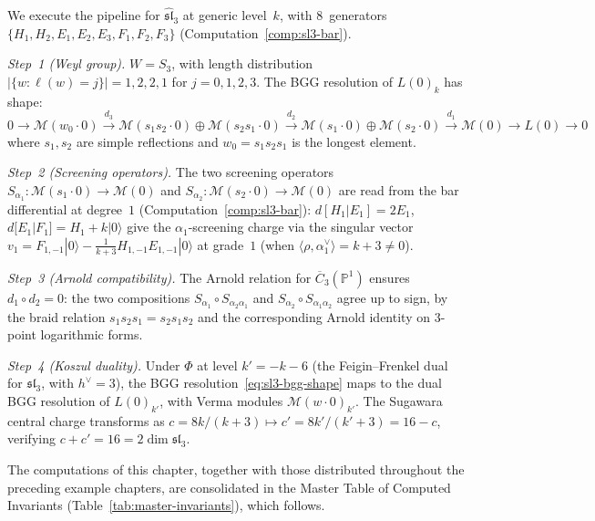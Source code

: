 \begin{example}
\label{ex:sl3-bgg-pipeline}
We execute the pipeline for $\widehat{\mathfrak{sl}}_3$ at generic
level~$k$, with $8$~generators
$\{H_1, H_2, E_1, E_2, E_3, F_1, F_2, F_3\}$
(Computation~\ref{comp:sl3-bar}).

\emph{Step~1 (Weyl group).}
$W = S_3$, with length distribution
$|\{w : \ell(w) = j\}| = 1, 2, 2, 1$ for $j = 0, 1, 2, 3$.
The BGG resolution of $L(0)_k$ has shape:
\begin{equation}\label{eq:sl3-bgg-shape}
0 \to \mathcal{M}(w_0 \cdot 0)
\xrightarrow{d_3}
\mathcal{M}(s_1 s_2 \cdot 0) \oplus \mathcal{M}(s_2 s_1 \cdot 0)
\xrightarrow{d_2}
\mathcal{M}(s_1 \cdot 0) \oplus \mathcal{M}(s_2 \cdot 0)
\xrightarrow{d_1}
\mathcal{M}(0) \to L(0) \to 0
\end{equation}
where $s_1, s_2$ are simple reflections and $w_0 = s_1 s_2 s_1$
is the longest element.

\emph{Step~2 (Screening operators).}
The two screening operators
$S_{\alpha_1}\colon \mathcal{M}(s_1 \cdot 0) \to \mathcal{M}(0)$
and
$S_{\alpha_2}\colon \mathcal{M}(s_2 \cdot 0) \to \mathcal{M}(0)$
are read from the bar differential at degree~$1$
(Computation~\ref{comp:sl3-bar}):
$d[H_1|E_1] = 2E_1$, $d[E_1|F_1] = H_1 + k|0\rangle$ give the
$\alpha_1$-screening charge via the singular vector
$v_1 = F_{1,-1}|0\rangle - \frac{1}{k+3}H_{1,-1}E_{1,-1}|0\rangle$
at grade~$1$ (when $\langle \rho, \alpha_1^\vee\rangle = k+3 \neq 0$).

\emph{Step~3 (Arnold compatibility).}
The Arnold relation for $\overline{C}_3(\mathbb{P}^1)$
ensures $d_1 \circ d_2 = 0$: the two compositions
$S_{\alpha_1} \circ S_{\alpha_2 \alpha_1}$ and
$S_{\alpha_2} \circ S_{\alpha_1 \alpha_2}$
agree up to sign, by the braid relation
$s_1 s_2 s_1 = s_2 s_1 s_2$ and the corresponding
Arnold identity on $3$-point logarithmic forms.

\emph{Step~4 (Koszul duality).}
Under $\Phi$ at level $k' = -k - 6$ (the Feigin--Frenkel dual
for $\mathfrak{sl}_3$, with $h^\vee = 3$), the BGG
resolution~\eqref{eq:sl3-bgg-shape}
maps to the dual BGG resolution of $L(0)_{k'}$,
with Verma modules $\mathcal{M}(w \cdot 0)_{k'}$.
The Sugawara central charge transforms as
$c = 8k/(k+3) \mapsto c' = 8k'/(k'+3) = 16 - c$,
verifying $c + c' = 16 = 2 \dim \mathfrak{sl}_3$.
\end{example}

\medskip

\noindent
The computations of this chapter, together with those distributed throughout the preceding example chapters, are consolidated in the Master Table of Computed Invariants (Table~\ref{tab:master-invariants}), which follows.
